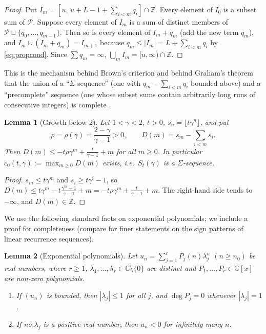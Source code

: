 \documentclass[11pt]{amsart}
\newtheorem{lemma}{Lemma}[section]
\theoremstyle{definition}
\theoremstyle{remark}
\newcommand{\Z}{\mathbb{Z}}
\newcommand{\C}{\mathbb{C}}
\newcommand{\fl}[1]{\lfloor #1\rfloor}
\begin{document}
\begin{proof}
Put $I_m=[u,\,u+L-1+\sum_{i<m}q_i]\cap\Z$. Every element of $I_0$ is a subset sum of
$\mathcal P$. Suppose every element of $I_m$ is a sum of distinct members of
$\mathcal P\sqcup\{q_0,\dots,q_{m-1}\}$. Then so is every element of $I_m+q_m$ (add the
new term $q_m$), and $I_m\cup(I_m+q_m)=I_{m+1}$ because $q_m\le|I_m|=L+\sum_{i<m}q_i$ by
\eqref{eq:propcond}. Since $\sum q_m=\infty$, $\bigcup_mI_m=[u,\infty)\cap\Z$.
\end{proof}

This is the mechanism behind Brown's criterion \cite{Bro61} and behind Graham's theorem that
the union of a ``$\Sigma$-sequence'' (one with $q_m-\sum_{i<m}q_i$ bounded above) and a
``precomplete'' sequence (one whose subset sums contain arbitrarily long runs of
consecutive integers) is complete \cite{Gra64}.

\begin{lemma}[Growth below $2$]\label{lem:growth}
Let $1<\gamma<2$, $t>0$, $s_n=\fl{t\gamma^n}$, and put
\[
  \rho=\rho(\gamma)=\frac{2-\gamma}{\gamma-1}>0,\qquad D(m)=s_m-\sum_{i<m}s_i .
\]
Then $D(m)\le -t\rho\gamma^m+\frac{t}{\gamma-1}+m$ for all $m\ge0$. In particular
$c_0(t,\gamma):=\max_{m\ge0}D(m)$ exists, i.e.\ $S_t(\gamma)$ is a $\Sigma$-sequence.
\end{lemma}

\begin{proof}
$s_m\le t\gamma^m$ and $s_i\ge t\gamma^i-1$, so
$D(m)\le t\gamma^m-t\frac{\gamma^m-1}{\gamma-1}+m=-t\rho\gamma^m+\frac t{\gamma-1}+m$.
The right-hand side tends to $-\infty$, and $D(m)\in\Z$.
\end{proof}

We use the following standard facts on exponential polynomials; we include a proof for
completeness (compare \cite{BG07} for finer statements on the sign patterns of linear
recurrence sequences).

\begin{lemma}[Exponential polynomials]\label{lem:exppoly}
Let $u_n=\sum_{j=1}^rP_j(n)\lambda_j^n$ $(n\ge n_0)$ be real numbers, where $r\ge1$,
$\lambda_1,\dots,\lambda_r\in\C\setminus\{0\}$ are distinct and $P_1,\dots,P_r\in\C[x]$ are
non-zero polynomials.
\begin{enumerate}[label=(\alph*)]
\item If $(u_n)$ is bounded, then $|\lambda_j|\le1$ for all $j$, and $\deg P_j=0$ whenever
$|\lambda_j|=1$.
\item If no $\lambda_j$ is a positive real number, then $u_n<0$ for infinitely many $n$.
\end{enumerate}
\end{lemma}
\end{document}

